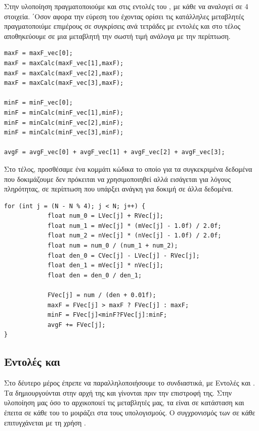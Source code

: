 \documentclass{article}
\begin{document}
\vspace{5mm}
Στην υλοποίηση πραγματοποιούμε  και  στις εντολές του , με κάθε  να αναλογεί σε 4 στοιχεία. ΄Οσον αφορα την εύρεση του  έχοντας ορίσει τις κατάλληλες  μεταβλητές πραγματοποιύμε επιμέρους σε συγκρίσεις ανά τετράδες με  εντολές και στο τέλος αποθηκεύουμε σε μια  μεταβλητή την σωστή τιμή ανάλογα με την περίπτωση.\\
\newpage
{}
\begin{lstlisting}
maxF = maxF_vec[0];
maxF = maxCalc(maxF_vec[1],maxF);
maxF = maxCalc(maxF_vec[2],maxF);
maxF = maxCalc(maxF_vec[3],maxF);

minF = minF_vec[0];
minF = minCalc(minF_vec[1],minF);
minF = minCalc(minF_vec[2],minF);
minF = minCalc(minF_vec[3],minF);

avgF = avgF_vec[0] + avgF_vec[1] + avgF_vec[2] + avgF_vec[3];
\end{lstlisting}
\vspace{5mm}
Στο τέλος, προσθέσαμε ένα κομμάτι κώδικα το οποίο για τα συγκεκριμένα δεδομένα που δοκιμάζουμε δεν πρόκειται να χρησιμοποιηθεί αλλά εισάγεται για λόγους πληρότητας, σε περίπτωση που υπάρξει ανάγκη για δοκιμή σε άλλα δεδομένα.

\begin{lstlisting}
for (int j = (N - N % 4); j < N; j++) {
            float num_0 = LVec[j] + RVec[j];
            float num_1 = mVec[j] * (mVec[j] - 1.0f) / 2.0f;
            float num_2 = nVec[j] * (nVec[j] - 1.0f) / 2.0f;
            float num = num_0 / (num_1 + num_2);
            float den_0 = CVec[j] - LVec[j] - RVec[j];
            float den_1 = mVec[j] * nVec[j];
            float den = den_0 / den_1;

            FVec[j] = num / (den + 0.01f);
            maxF = FVec[j] > maxF ? FVec[j] : maxF;
            minF = FVec[j]<minF?FVec[j]:minF;
            avgF += FVec[j];
}
\end{lstlisting}

\subsection{ Εντολές και  }

Στο δέυτερο μέρος έπρεπε να παραλληλοποιήσουμε το  συνδιαστικά, με  Εντολές και . 
Τα  δημιουργούνται στην αρχή της  και γίνονται  πριν την επιστροφή της. Στην υλοποίηση μας όσο το  αρχικοποιεί τις μεταβλητές μας, τα  είναι σε κατάσταση  και έπειτα σε κάθε  του  το  μοιράζει στα  τους υπολογισμούς. Ο συγχρονισμός των  σε κάθε  επιτυγχάνεται με τη χρήση .
\end{document}
